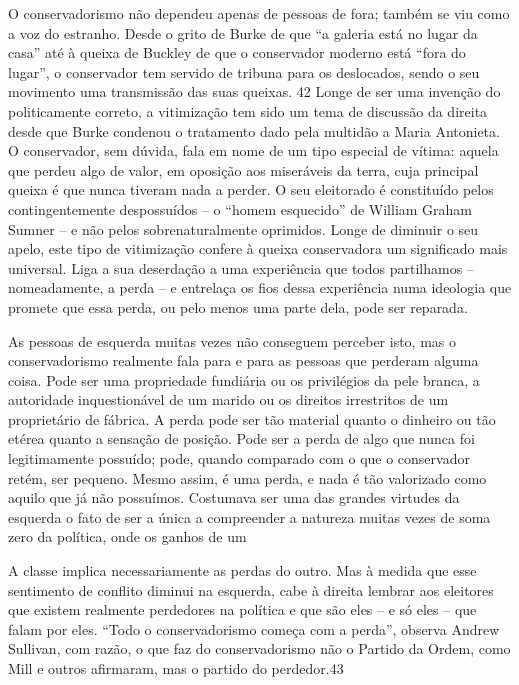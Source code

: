 O conservadorismo não dependeu apenas de pessoas de fora; também se viu como a voz do estranho. Desde o grito de Burke de que “a galeria está no lugar da casa” até à queixa de Buckley de que o conservador moderno está “fora do lugar”, o conservador tem servido de tribuna para os deslocados, sendo o seu movimento uma transmissão das suas queixas. {\color{blue}42} Longe de ser uma invenção do politicamente correto, a vitimização tem sido um tema de discussão da direita desde que Burke condenou o tratamento dado pela multidão a Maria Antonieta. O conservador, sem dúvida, fala em nome de um tipo especial de vítima: aquela que perdeu algo de valor, em oposição aos miseráveis ​​da terra, cuja principal queixa é que nunca tiveram nada a perder. O seu eleitorado é constituído pelos contingentemente despossuídos – o “homem esquecido” de William Graham Sumner – e não pelos sobrenaturalmente oprimidos. Longe de diminuir o seu apelo, este tipo de vitimização confere à queixa conservadora um significado mais universal. Liga a sua deserdação a uma experiência que todos partilhamos – nomeadamente, a perda – e entrelaça os fios dessa experiência numa ideologia que promete que essa perda, ou pelo menos uma parte dela, pode ser reparada.
 \par 
As pessoas de esquerda muitas vezes não conseguem perceber isto, mas o conservadorismo realmente fala para e para as pessoas que perderam alguma coisa. Pode ser uma propriedade fundiária ou os privilégios da pele branca, a autoridade inquestionável de um marido ou os direitos irrestritos de um proprietário de fábrica. A perda pode ser tão material quanto o dinheiro ou tão etérea quanto a sensação de posição. Pode ser a perda de algo que nunca foi legitimamente possuído; pode, quando comparado com o que o conservador retém, ser pequeno. Mesmo assim, é uma perda, e nada é tão valorizado como aquilo que já não possuímos. Costumava ser uma das grandes virtudes da esquerda o fato de ser a única a compreender a natureza muitas vezes de soma zero da política, onde os ganhos de um
 \par 
A classe implica necessariamente as perdas do outro. Mas à medida que esse sentimento de conflito diminui na esquerda, cabe à direita lembrar aos eleitores que existem realmente perdedores na política e que são eles – e só eles – que falam por eles. “Todo o conservadorismo começa com a perda”, observa Andrew Sullivan, com razão, o que faz do conservadorismo não o Partido da Ordem, como Mill e outros afirmaram, mas o partido do perdedor.{\color{blue}43}
 \par 
